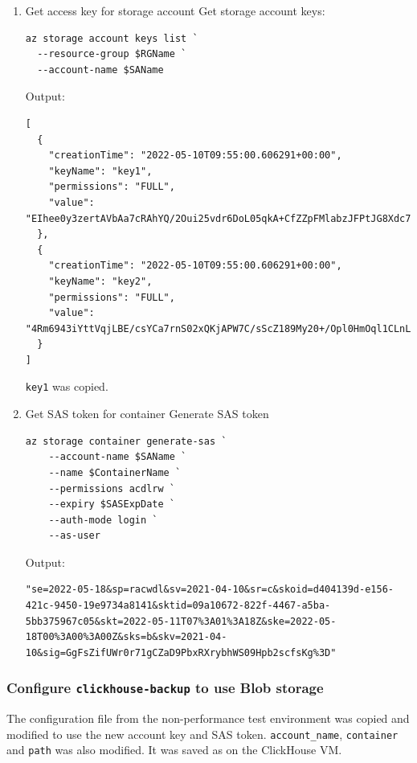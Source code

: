 \begin{enumerate}
\item Get access key for storage account
\label{sec:org9369db9}
Get storage account keys:
\begin{verbatim}
az storage account keys list `
  --resource-group $RGName `
  --account-name $SAName
\end{verbatim}

Output:
\begin{verbatim}
[
  {
    "creationTime": "2022-05-10T09:55:00.606291+00:00",
    "keyName": "key1",
    "permissions": "FULL",
    "value": "EIhee0y3zertAVbAa7cRAhYQ/2Oui25vdr6DoL05qkA+CfZZpFMlabzJFPtJG8Xdc735PAbA8w8r+AStl89ieA=="
  },
  {
    "creationTime": "2022-05-10T09:55:00.606291+00:00",
    "keyName": "key2",
    "permissions": "FULL",
    "value": "4Rm6943iYttVqjLBE/csYCa7rnS02xQKjAPW7C/sScZ189My20+/Opl0HmOql1CLnL53x5NYzB/5+AStAqv2kw=="
  }
]
\end{verbatim}

\texttt{key1} was copied.

\item Get SAS token for container
\label{sec:org2a7114d}
Generate SAS token
\begin{verbatim}
az storage container generate-sas `
    --account-name $SAName `
    --name $ContainerName `
    --permissions acdlrw `
    --expiry $SASExpDate `
    --auth-mode login `
    --as-user
\end{verbatim}

Output:

\begin{verbatim}
"se=2022-05-18&sp=racwdl&sv=2021-04-10&sr=c&skoid=d404139d-e156-421c-9450-19e9734a8141&sktid=09a10672-822f-4467-a5ba-5bb375967c05&skt=2022-05-11T07%3A01%3A18Z&ske=2022-05-18T00%3A00%3A00Z&sks=b&skv=2021-04-10&sig=GgFsZifUWr0r71gCZaD9PbxRXrybhWS09Hpb2scfsKg%3D"
\end{verbatim}
\end{enumerate}
\subsubsection{Configure \texttt{clickhouse-backup} to use Blob storage}
\label{sec:org265a2b6}
The configuration file from the non-performance test environment
was copied and modified to use the new account key and SAS token.
\texttt{account\_name}, \texttt{container} and \texttt{path} was also modified.
It was saved as  on the ClickHouse VM.

